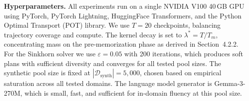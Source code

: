 \documentclass[runningheads]{llncs}
\begin{document}
\textbf{Hyperparameters.}
All experiments run on a single NVIDIA V100 40\,GB GPU using PyTorch, PyTorch Lightning, HuggingFace Transformers, and the Python Optimal Transport (POT) library.
We use $T = 20$ checkpoints, balancing trajectory coverage and compute.
The kernel decay is set to $\lambda^* = T / T_m$, concentrating mass on the pre-memorization phase as derived in Section~4.2.2.
For the Sinkhorn solver we use $\varepsilon = 0.05$ with 200 iterations, which produces soft plans with sufficient diversity and converges for all tested pool sizes.
The synthetic pool size is fixed at $|\mathcal{D}_\text{synth}| = 5{,}000$, chosen based on empirical saturation across all tested domains.
The language model generator is Gemma-3-270M, which is small, fast, and sufficient for in-domain fluency at this pool size.



\end{document}
